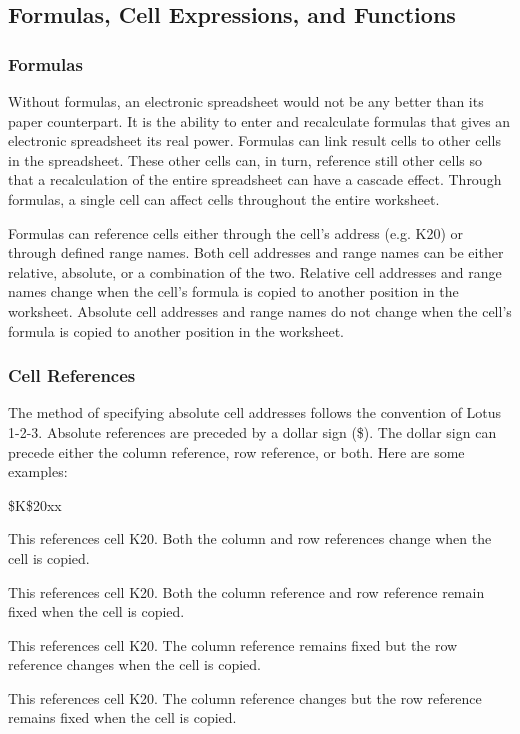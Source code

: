 \subsection*{Formulas, Cell Expressions, and Functions}

\subsubsection*{Formulas}

    Without formulas, an electronic spreadsheet would not be any better than 
its paper counterpart.  It is the ability to enter and recalculate formulas 
that gives an electronic spreadsheet its real power.  Formulas can link result 
cells to other cells in the spreadsheet.  These other cells can, in turn, 
reference still other cells so that a recalculation of the entire spreadsheet 
can have a cascade effect.  Through formulas, a single cell can affect cells 
throughout the entire worksheet.

    Formulas can reference cells either through the cell's address (e.g. K20) 
or through defined range names.  Both cell addresses and range names can be 
either relative, absolute, or a combination of the two.  Relative cell 
addresses and range names change when the cell's formula is copied to another 
position in the worksheet.  Absolute cell addresses and range names do not 
change when the cell's formula is copied to another position in the worksheet.

\subsubsection*{Cell References}

    The method of specifying absolute cell addresses follows the convention of 
Lotus 1-2-3.  Absolute references are preceded by a dollar sign (\$).  The
dollar sign can precede either the column reference, row reference, or both.  
Here are some examples:
\begin{namelist}{\$K\$20xx}
\item[K20]{This references cell K20.  Both the column and row references
change when the cell is copied.}

\item[\$K\$20]{This references cell K20.  Both the column reference and row
reference remain fixed when the cell is copied.}

\item[\$K20]{This references cell K20.  The column reference remains fixed but
the row reference changes when the cell is copied.}

\item[K\$20]{This references cell K20.  The column reference changes but the
row reference remains fixed when the cell is copied.}
\end{namelist}


